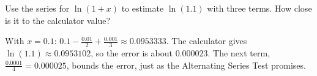 \begin{Exercise}[label = seriescalc2]
Use the series for $\ln(1+x)$ to estimate $\ln(1.1)$ with three terms. How
close is it to the calculator value?
\end{Exercise}

\begin{Answer}[ref = seriescalc2]
With $x = 0.1$: $0.1 - \frac{0.01}{2} + \frac{0.001}{3} \approx 0.0953333$.
The calculator gives $\ln(1.1) \approx 0.0953102$, so the error is about
$0.000023$. The next term, $\frac{0.0001}{4} = 0.000025$, bounds the error, just
as the Alternating Series Test promises.
\end{Answer}

